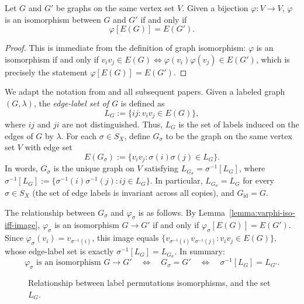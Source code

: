 \begin{lemma}\label{lemma:varphi-iso-iff-image}
    Let $G$ and $G'$ be graphs on the same vertex set $V$.
    Given a bijection $\varphi\colon V\to V$, $\varphi$ is an isomorphism between $G$ and $G'$ if and only if $$\varphi[E(G)]=E(G').$$
\end{lemma}

\begin{proof}
    This is immediate from the definition of graph isomorphism: $\varphi$ is an isomorphism if and only if $v_iv_j\in E(G)\Leftrightarrow \varphi(v_i)\varphi(v_j)\in E(G')$, which is precisely the statement $\varphi[E(G)]=E(G')$.
\end{proof}

We adapt the notation from \cite{Caro2020GraphsIU} and all subsequent papers.
Given a labeled graph $(G,\lambda)$, the \emph{edge-label set of $G$} is defined as
\[
    L_G:=\{ij : v_iv_j\in E(G)\},
\]
where $ij$ and $ji$ are not distinguished.
Thus, $L_G$ is the set of labels induced on the edges of $G$ by $\lambda$.
For each $\sigma\in S_X$, define $G_\sigma$ to be the graph on the same vertex set $V$ with edge set
\[
    E(G_\sigma):=\{v_iv_j : \sigma(i)\sigma(j)\in L_G\}.
\]
In words, $G_\sigma$ is the unique graph on $V$ satisfying $L_{G_\sigma}=\sigma^{-1}[L_G]$, where $\sigma^{-1}[L_G]:=\{\sigma^{-1}(i)\sigma^{-1}(j):ij\in L_G\}$.
In particular, $L_{G_\sigma}=L_G$ for every $\sigma\in S_X$ (the set of edge labels is invariant across all copies), and $G_{\text{id}}=G$.

The relationship between $G_\sigma$ and $\varphi_\sigma$ is as follows.
By Lemma~\ref{lemma:varphi-iso-iff-image}, $\varphi_\sigma$ is an isomorphism $G\to G'$ if and only if $\varphi_\sigma[E(G)]=E(G')$.
Since $\varphi_\sigma(v_i)=v_{\sigma^{-1}(i)}$, this image equals $\{v_{\sigma^{-1}(i)}v_{\sigma^{-1}(j)}:v_iv_j\in E(G)\}$, whose edge-label set is exactly $\sigma^{-1}[L_G]=L_{G_\sigma}$.
In summary:
\begin{equation}\label{eq:gsigma-varphi}
    \varphi_\sigma \text{ is an isomorphism } G\to G' \quad\Longleftrightarrow\quad G_\sigma = G' \quad\Longleftrightarrow\quad \sigma^{-1}[L_G]=L_{G'}.
\end{equation}

\begin{figure}[ht]
    \centering
    
    \caption{Relationship between label permutations isomorphisms, and the set $L_G$.}
    \label{fig:square-lambda-L_G}
\end{figure}

